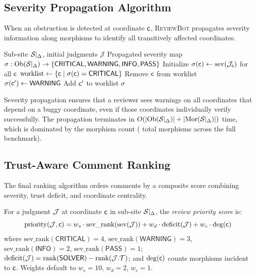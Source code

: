 \documentclass[11pt]{article}
\newcommand{\ReviewBot}{\textsc{ReviewBot}}
\newcommand{\Severity}{\mathrm{sev}}
\newcommand{\SevCritical}{\mathsf{CRITICAL}}
\newcommand{\SevWarning}{\mathsf{WARNING}}
\newcommand{\SevInfo}{\mathsf{INFO}}
\newcommand{\SevPass}{\mathsf{PASS}}
\begin{document}
\subsection{Severity Propagation Algorithm}

When an obstruction is detected at coordinate $\mathsf{c}$, \ReviewBot{}
propagates severity information along morphisms to identify all
transitively affected coordinates.

\begin{algorithm}[t]
\caption{Severity Propagation via Morphism Graph}
\label{alg:severity-prop}
\begin{algorithmic}[1]
\REQUIRE Sub-site $\mathcal{S}|_\Delta$, initial judgments $\mathcal{J}$
\ENSURE Propagated severity map $\sigma : \Ob(\Site|_\Delta) \to
        \{\SevCritical, \SevWarning, \SevInfo, \SevPass\}$
\STATE Initialize $\sigma(\coord) \gets \Severity(\J_\coord)$
       for all $\mathsf{c}$
\STATE $\text{worklist} \gets \{\coord \mid
       \sigma(\coord) = \SevCritical\}$
  \STATE Remove $\mathsf{c}$ from worklist
    \IF{$\sigma(\coord') \neq \SevCritical$ and
        $\sigma(\coord') \neq \SevWarning$}
      \STATE $\sigma(\coord') \gets \SevWarning$
      \STATE Add $\mathsf{c}'$ to worklist
    \ENDIF
  \ENDFOR
\ENDWHILE
\RETURN $\sigma$
\end{algorithmic}
\end{algorithm}

Severity propagation ensures that a reviewer sees warnings on all
coordinates that depend on a buggy coordinate, even if those coordinates
individually verify successfully. The propagation terminates in
$O(|\mathrm{Ob}(\mathcal{S}|_\Delta)| + |\mathrm{Mor}(\mathcal{S}|_\Delta)|)$ time, which is
dominated by the morphism count (\compMorphTotal{} total morphisms
across the full benchmark).

\subsection{Trust-Aware Comment Ranking}

The final ranking algorithm orders comments by a composite score combining
severity, trust deficit, and coordinate centrality.

\begin{definition}\label{def:priority}
For a judgment $\mathcal{J}$ at coordinate $\mathsf{c}$ in sub-site $\mathcal{S}|_\Delta$,
the \emph{review priority score} is:
\[
  \mathrm{priority}(\J, \coord) =
    w_s \cdot \mathrm{sev\_rank}(\Severity(\J)) +
    w_d \cdot \mathrm{deficit}(\J) +
    w_c \cdot \mathrm{deg}(\coord)
\]
where $\mathrm{sev\_rank}(\SevCritical) = 4$,
$\mathrm{sev\_rank}(\SevWarning) = 3$,
$\mathrm{sev\_rank}(\SevInfo) = 2$,
$\mathrm{sev\_rank}(\SevPass) = 1$;
$\mathrm{deficit}(\mathcal{J}) = \mathrm{rank}(\mathsf{SOLVER}) - \mathrm{rank}(\mathcal{J}.\mathcal{T})$;
and $\mathrm{deg}(\mathsf{c})$ counts morphisms incident to $\mathsf{c}$.
Weights default to $w_s = 10$, $w_d = 2$, $w_c = 1$.
\end{definition}
\end{document}

